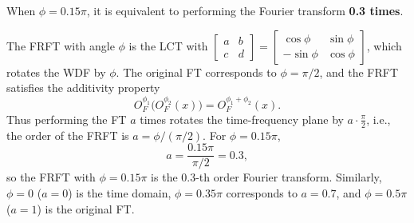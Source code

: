 \documentclass[12pt,a4paper]{article}
\begin{document}
\begin{enumerate}
When $\phi=0.15\pi$, it is equivalent to performing the Fourier transform \textbf{0.3 times}.

The FRFT with angle $\phi$ is the LCT with $\begin{bmatrix}a&b\\c&d\end{bmatrix}=\begin{bmatrix}\cos\phi&\sin\phi\\-\sin\phi&\cos\phi\end{bmatrix}$, which rotates the WDF by $\phi$. The original FT corresponds to $\phi=\pi/2$, and the FRFT satisfies the additivity property
\[
O_F^{\phi_1}\big(O_F^{\phi_2}(x)\big)=O_F^{\phi_1+\phi_2}(x).
\]
Thus performing the FT $a$ times rotates the time-frequency plane by $a\cdot\frac\pi2$, i.e., the order of the FRFT is $a=\phi/(\pi/2)$. For $\phi=0.15\pi$,
\[
a=\frac{0.15\pi}{\pi/2}=0.3,
\]
so the FRFT with $\phi=0.15\pi$ is the 0.3-th order Fourier transform. Similarly, $\phi=0$ ($a=0$) is the time domain, $\phi=0.35\pi$ corresponds to $a=0.7$, and $\phi=0.5\pi$ ($a=1$) is the original FT.

\end{enumerate}
\end{document}
